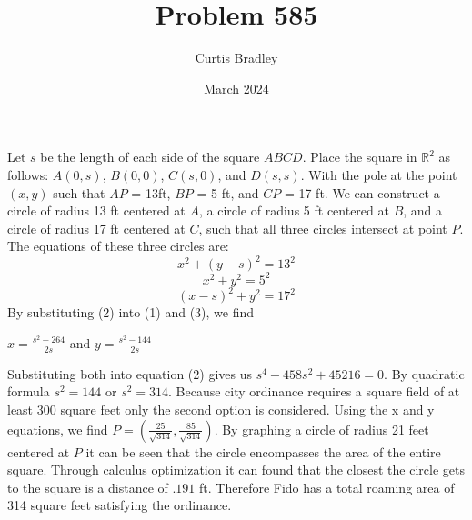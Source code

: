 \documentclass{article}
\title{Problem 585}
\author{Curtis Bradley}
\date{March 2024}
\begin{document}
Let $s$ be the length of each side of the square $ABCD$. Place the square in $\mathbb{R}^2$ as follows: $A(0,s)$, $B(0,0)$, $C(s,0)$, and $D(s,s)$. With the pole at the point $(x,y)$ such that $AP$ = 13ft, $BP$ = 5 ft, and $CP$ = 17 ft. We can construct a circle of radius 13 ft centered at $A$, a circle of radius 5 ft centered at $B$, and a circle of radius 17 ft centered at $C$, such that all three circles intersect at point $P$. The equations of these three circles are:
\begin{equation}
    x^2 + (y-s)^2 = 13^2
\end{equation}
\begin{equation}
    x^2+y^2 = 5^2
\end{equation}
\begin{equation}
    (x-s)^2 + y^2 = 17 ^2
\end{equation}
By substituting (2) into (1) and (3), we find 

\begin{center}
    $x = \frac{s^2-264}{2s}$ and $y=\frac{s^2 - 144}{2s}$
\end{center}
Substituting both into equation (2) gives us
$s^4 - 458s^2+ 45216 = 0$. By quadratic formula $s^2 = 144$ or $s^2 = 314$. Because city ordinance requires a square field of at least 300 square feet only the second option is considered. Using the x and y equations, we find $P = (\frac{25}{\sqrt{314}},\frac{85}{\sqrt{314}})$. By graphing a circle of radius 21 feet centered at $P$ it can be seen that the circle encompasses the area of the entire square. Through calculus optimization it can found that the closest the circle gets to the square is a distance of $.191$ ft. Therefore Fido has a total roaming area of 314 square feet satisfying the ordinance.
\end{document}
